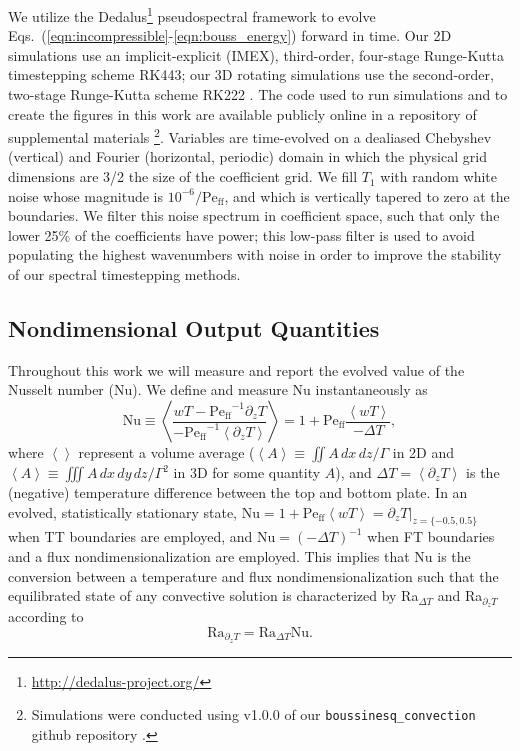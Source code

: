 \documentclass[aps, pre, onecolumn, nofootinbib, notitlepage, groupedaddress, amsfonts, amssymb, amsmath, longbibliography, superscriptaddress]{revtex4-1}
\newcommand{\angles}[1]{\ensuremath{\left\langle #1 \right\rangle}}
\newcommand{\Peff}{\ensuremath{\text{Pe}_{\text{ff}}}}
\begin{document}
We utilize the Dedalus\footnote{\url{http://dedalus-project.org/}} pseudospectral framework \cite{burns&all2016, burns&all2019} to evolve Eqs.~(\ref{eqn:incompressible}-\ref{eqn:bouss_energy}) forward in time.
Our 2D simulations use an implicit-explicit (IMEX), third-order, four-stage Runge-Kutta timestepping scheme RK443; our 3D rotating simulations use the second-order, two-stage Runge-Kutta scheme RK222 \cite{ascher&all1997}. 
The code used to run simulations and to create the figures in this work are available publicly online in a repository of supplemental materials \cite{anders&all2020a_supp}\footnote{Simulations were conducted using v1.0.0 of our \texttt{boussinesq\_convection} github repository \cite{code:boussinesq_convection}.}.
Variables are time-evolved on a dealiased Chebyshev (vertical) and Fourier (horizontal, periodic) domain in which the physical grid dimensions are 3/2 the size of the coefficient grid.  
We fill $T_1$ with random white noise whose magnitude is $10^{-6}/\Peff$, and which is vertically tapered to zero at the boundaries.
We filter this noise spectrum in coefficient space, such that only the lower 25\% of the coefficients have power; this low-pass filter is used to avoid populating the highest wavenumbers with noise in order to improve the stability of our spectral timestepping methods.


\subsection{Nondimensional Output Quantities}
\label{sec:ra_nu_relations}
Throughout this work we will measure and report the evolved value of the Nusselt number (Nu).
We define and measure Nu instantaneously as
\begin{equation}
\text{Nu} \equiv \angles{\frac{w T - \Peff^{-1} \partial_z T}{-\Peff^{-1} \angles{\partial_z T}}}
= 1 + \Peff\frac{\angles{w T}}{-\Delta T},
\end{equation}
where $\angles{}$ represent a volume average ($\angles{A} \equiv \iint A\,dx\,dz / \Gamma$ in 2D and $\angles{A} \equiv \iiint A\,dx\,dy\,dz / \Gamma^2$ in 3D for some quantity $A$), and $\Delta T = \angles{\partial_z T}$ is the (negative) temperature difference between the top and bottom plate.
In an evolved, statistically stationary state, $\left.\text{Nu} = 1 + \Peff\angles{wT} = \partial_z T\right|_{z = \{-0.5, 0.5\}}$ when TT boundaries are employed, and $\text{Nu} = (-\Delta T)^{-1}$ when FT boundaries and a flux nondimensionalization are employed.
This implies that Nu is the conversion between a temperature and flux nondimensionalization such that the equilibrated state of any convective solution is characterized by Ra$_{\Delta T}$ and Ra$_{\partial_z T}$ according to
\begin{equation}
\text{Ra}_{\partial_z T} = \text{Ra}_{\Delta T} \text{Nu}.
\label{eqn:ra_relation}
\end{equation}
\end{document}

